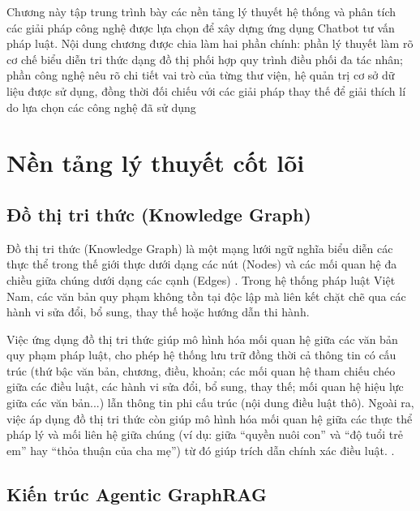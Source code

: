 \documentclass[../DoAn.tex]{subfiles}
\begin{document}
Chương này tập trung trình bày các nền tảng lý thuyết hệ thống và phân tích các giải pháp công nghệ được lựa chọn để xây dựng ứng dụng Chatbot tư vấn pháp luật. Nội dung chương được chia làm hai phần chính: phần lý thuyết làm rõ cơ chế biểu diễn tri thức dạng đồ thị phối hợp quy trình điều phối đa tác nhân; phần công nghệ nêu rõ chi tiết vai trò của từng thư viện, hệ quản trị cơ sở dữ liệu được sử dụng, đồng thời đối chiếu với các giải pháp thay thế để giải thích lí do lựa chọn các công nghệ đã sử dụng

\section{Nền tảng lý thuyết cốt lõi}
\label{section:3.1}

\subsection{Đồ thị tri thức (Knowledge Graph)}
\label{subsection:3.1.1}

Đồ thị tri thức (Knowledge Graph) là một mạng lưới ngữ nghĩa biểu diễn các thực thể trong thế giới thực dưới dạng các nút (Nodes) và các mối quan hệ đa chiều giữa chúng dưới dạng các cạnh (Edges) \cite{Hogan_2021}. Trong hệ thống pháp luật Việt Nam, các văn bản quy phạm không tồn tại độc lập mà liên kết chặt chẽ qua các hành vi sửa đổi, bổ sung, thay thế hoặc hướng dẫn thi hành. 

Việc ứng dụng đồ thị tri thức giúp mô hình hóa mối quan hệ giữa các văn bản quy phạm pháp luật, cho phép hệ thống lưu trữ đồng thời cả thông tin có cấu trúc (thứ bậc văn bản, chương, điều, khoản; các mối quan hệ tham chiếu chéo giữa các điều luật, các hành vi sửa đổi, bổ sung, thay thế; mối quan hệ hiệu lực giữa các văn bản...) lẫn thông tin phi cấu trúc (nội dung điều luật thô). Ngoài ra, việc áp dụng đồ thị tri thức còn giúp mô hình hóa mối quan hệ giữa các thực thể pháp lý và mối liên hệ giữa chúng (ví dụ: giữa “quyền nuôi con” và “độ tuổi trẻ em” hay “thỏa thuận của cha mẹ”) từ đó giúp trích dẫn chính xác điều luật. \cite{pmlr-v304-zhang26a}. 

\subsection{Kiến trúc Agentic GraphRAG}
\label{subsection:3.1.2}
\end{document}
